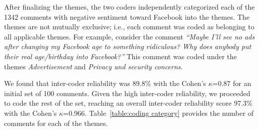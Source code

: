 After finalizing the themes, the two coders independently categorized each of the 1342 comments with negative sentiment toward Facebook into the themes. The themes are not mutually exclusive; i.e., each comment was coded as belonging to all applicable themes. For example, consider the comment \textit{``Maybe I'll see no ads after changing my Facebook age to something ridiculous? Why does anybody put their real age/birthday into Facebook?''} This comment was coded under the themes \textit{Advertisement} and \textit{Privacy and security concerns}.

We found that inter-coder reliability was 89.8\% with the Cohen's $\kappa$=0.87 for an initial set of 100 comments. Given the high inter-coder reliability, we proceeded to code the rest of the set, reaching an overall inter-coder reliability score 97.3\% with the Cohen's $\kappa$=0.966. Table~\ref{table:coding category} provides the number of comments for each of the themes.




